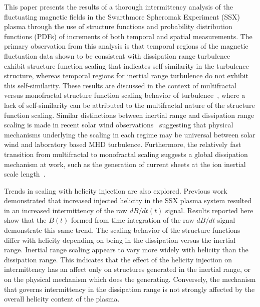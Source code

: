 \documentclass[aps,prl,amsmath,amssymb,reprint,superscriptaddress]{revtex4-1} %
\begin{document}
This paper presents the results of a thorough intermittency analysis of the fluctuating magnetic fields in the Swarthmore Spheromak Experiment (SSX) plasma through the use of structure functions and probability distribution functions (PDFs) of increments of both temporal and spatial measurements. The primary observation from this analysis is that temporal regions of the magnetic fluctuation data shown to be consistent with dissipation range turbulence~\cite{schaffner2014c} exhibit structure function scaling that indicates self-similarity in the turbulence structure, whereas temporal regions for inertial range turbulence do not exhibit this self-similarity. These results are discussed in the context of multifractal versus monofractal structure function scaling behavior of turbulence~\cite{frisch1995,marsch1997}, where a lack of self-similarity can be attributed to the multifractal nature of the structure function scaling. Similar distinctions between inertial range and dissipation range scaling is made in recent solar wind observations~\cite{kiyani2013} suggesting that physical mechanisms underlying the scaling in each regime may be universal between solar wind and laboratory based MHD turbulence. Furthermore, the relatively fast transition from multifractal to monofractal scaling suggests a global dissipation mechanism at work, such as the generation of current sheets at the ion inertial scale length~\cite{kiyani2009,kiyani2010}.

Trends in scaling with helicity injection are also explored. Previous work~\cite{schaffner2014b} demonstrated that increased injected helicity in the SSX plasma system resulted in an increased intermittency of the raw $dB/dt(t)$ signal. Results reported here show that the $B(t)$ formed from time integration of the raw $dB/dt$ signal demonstrate this same trend. The scaling behavior of the structure functions differ with helicity depending on being in the dissipation versus the inertial range. Inertial range scaling appears to vary more widely with helicity than the dissipation range. This indicates that the effect of the helicity injection on intermittency has an affect only on structures generated in the inertial range, or on the physical mechanism which does the generating. Conversely, the mechanism that governs intermittency in the dissipation range is not strongly affected by the overall helicity content of the plasma.
\end{document}
